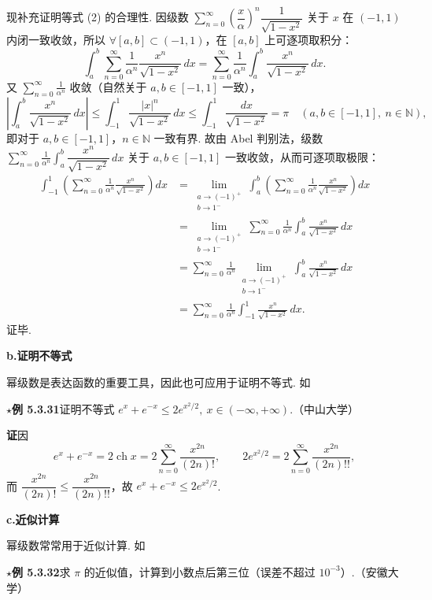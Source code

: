 \documentclass[UTF8,12pt,a4paper,fontset=fandol]{ctexart}
\begin{document}
现补充证明等式 (2) 的合理性. 因级数
$\displaystyle\sum_{n=0}^{\infty}\left(\dfrac{x}{\alpha}\right)^n\dfrac1{\sqrt{1-x^2}}$
关于 $x$ 在 $(-1,1)$ 内闭一致收敛，所以 $\forall[a,b]\subset(-1,1)$，在 $[a,b]$ 上可逐项取积分：
\[
  \int_a^b\sum_{n=0}^{\infty}\frac1{\alpha^n}\frac{x^n}{\sqrt{1-x^2}}\,dx
  =\sum_{n=0}^{\infty}\frac1{\alpha^n}\int_a^b\frac{x^n}{\sqrt{1-x^2}}\,dx.
\]
又 $\displaystyle\sum_{n=0}^{\infty}\frac1{\alpha^n}$ 收敛（自然关于 $a,b\in[-1,1]$ 一致），
\[
  \left|\int_a^b\frac{x^n}{\sqrt{1-x^2}}\,dx\right|
  \le\int_{-1}^1\frac{|x|^n}{\sqrt{1-x^2}}\,dx
  \le\int_{-1}^1\frac{dx}{\sqrt{1-x^2}}=\pi
  \quad(a,b\in[-1,1],\ n\in\mathbb N),
\]
即对于 $a,b\in[-1,1]$，$n\in\mathbb N$ 一致有界. 故由 Abel 判别法，级数
$\displaystyle\sum_{n=0}^{\infty}\frac1{\alpha^n}\int_a^b\dfrac{x^n}{\sqrt{1-x^2}}\,dx$
关于 $a,b\in[-1,1]$ 一致收敛，从而可逐项取极限：
\[
\begin{aligned}
\int_{-1}^1\left(\sum_{n=0}^{\infty}\frac1{\alpha^n}\frac{x^n}{\sqrt{1-x^2}}\right)dx
&=\lim_{\substack{a\to(-1)^+\\ b\to1^-}}\int_a^b\left(\sum_{n=0}^{\infty}\frac1{\alpha^n}\frac{x^n}{\sqrt{1-x^2}}\right)dx\\
&=\lim_{\substack{a\to(-1)^+\\ b\to1^-}}\sum_{n=0}^{\infty}\frac1{\alpha^n}\int_a^b\frac{x^n}{\sqrt{1-x^2}}\,dx\\
&=\sum_{n=0}^{\infty}\frac1{\alpha^n}\lim_{\substack{a\to(-1)^+\\ b\to1^-}}\int_a^b\frac{x^n}{\sqrt{1-x^2}}\,dx\\
&=\sum_{n=0}^{\infty}\frac1{\alpha^n}\int_{-1}^1\frac{x^n}{\sqrt{1-x^2}}\,dx.
\end{aligned}
\]
证毕.

\noindent\textbf{b.\quad 证明不等式}

幂级数是表达函数的重要工具，因此也可应用于证明不等式. 如

\noindent\(\star\)\textbf{例 5.3.31}\quad 证明不等式
$e^x+e^{-x}\le2e^{x^2/2},\ x\in(-\infty,+\infty)$.（中山大学）

\noindent\textbf{证}\quad 因
\[
  e^x+e^{-x}=2\operatorname{ch}x=2\sum_{n=0}^{\infty}\frac{x^{2n}}{(2n)!},\qquad
  2e^{x^2/2}=2\sum_{n=0}^{\infty}\frac{x^{2n}}{(2n)!!},
\]
而 $\dfrac{x^{2n}}{(2n)!}\le\dfrac{x^{2n}}{(2n)!!}$，故
$e^x+e^{-x}\le2e^{x^2/2}$.

\noindent\textbf{c.\quad 近似计算}

幂级数常常用于近似计算. 如

\noindent\(\star\)\textbf{例 5.3.32}\quad 求 $\pi$ 的近似值，计算到小数点后第三位（误差不超过 $10^{-3}$）.（安徽大学）
\end{document}
